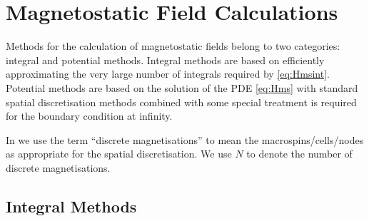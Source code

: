 \section{Magnetostatic Field Calculations}
\label{sec:magn-field-calc}

Methods for the calculation of magnetostatic fields belong to two categories: integral and potential methods.
Integral methods are based on efficiently approximating the very large number of integrals required by \cref{eq:Hmsint}.
Potential methods are based on the solution of the PDE \cref{eq:Hms} with standard spatial discretisation methods combined with some special treatment is required for the boundary condition at infinity.

In  we use the term ``discrete magnetisations'' to mean the macrospins/cells/nodes as appropriate for the spatial discretisation.
We use $N$ to denote the number of discrete magnetisations.


\subsection{Integral Methods}
\label{sec:magstat-field-calc-inte}



